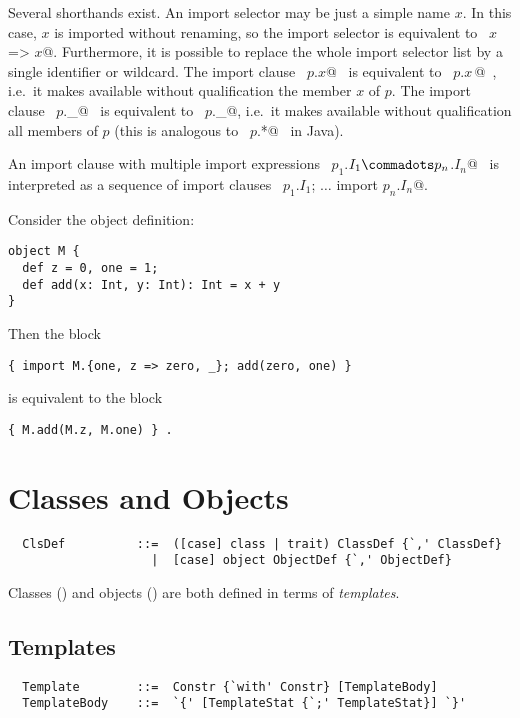 \documentclass[a4paper,12pt,twoside,titlepage]{book}
\begin{document}
Several shorthands exist. An import selector may be just a simple name
$x$. In this case, $x$ is imported without renaming, so the
import selector is equivalent to ~\lstinline@$x$ => $x$@. Furthermore, it is
possible to replace the whole import selector list by a single
identifier or wildcard. The import clause ~\lstinline@import $p$.$x$@~ is
equivalent to ~\lstinline@import $p$.{$x\,$}@~, i.e.\ it makes available without
qualification the member $x$ of $p$. The import clause
~\lstinline@import $p$._@~ is equivalent to
~\lstinline@import $p$.{_}@, 
i.e.\ it makes available without qualification all members of $p$
(this is analogous to ~\lstinline@import $p$.*@~ in Java).

An import clause with multiple import expressions
~\lstinline@import $p_1$.$I_1 \commadots p_n$.$I_n$@~ is interpreted as a
sequence of import clauses 
~\lstinline@import $p_1$.$I_1$; $\ldots$ import $p_n$.$I_n$@.

\example Consider the object definition:
\begin{lstlisting}
object M { 
  def z = 0, one = 1; 
  def add(x: Int, y: Int): Int = x + y 
}
\end{lstlisting}
Then the block
\begin{lstlisting}
{ import M.{one, z => zero, _}; add(zero, one) }
\end{lstlisting}
is equivalent to the block 
\begin{lstlisting}
{ M.add(M.z, M.one) } .
\end{lstlisting}

\chapter{Classes and Objects}
\label{sec:globaldefs}

\syntax\begin{lstlisting}
  ClsDef          ::=  ([case] class | trait) ClassDef {`,' ClassDef}
                    |  [case] object ObjectDef {`,' ObjectDef}
\end{lstlisting}

Classes () and objects
() are both defined in terms of {\em templates}.

\section{Templates}
\label{sec:templates}

\syntax\begin{lstlisting}
  Template        ::=  Constr {`with' Constr} [TemplateBody]
  TemplateBody    ::=  `{' [TemplateStat {`;' TemplateStat}] `}'
\end{lstlisting}
\end{document}
